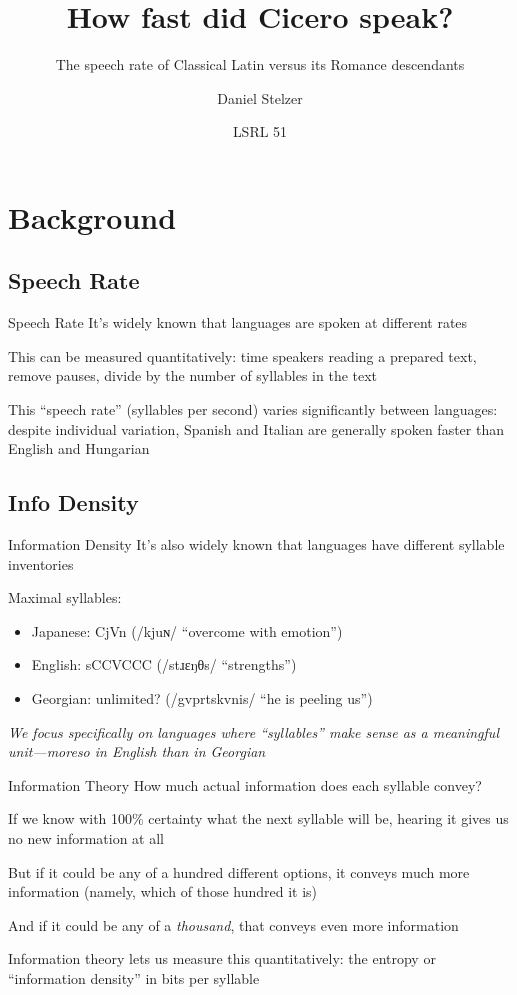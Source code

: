 \documentclass{beamer}
\title{How fast did Cicero speak?} \subtitle{The speech rate of Classical Latin versus its Romance descendants}
\author{Daniel Stelzer}
\institute{University of Illinois at Urbana-Champaign}
\date{LSRL 51}
\DeclareRobustCommand\ipa[1]{{\ipafamily/#1/}}
\begin{document}
\frame{\titlepage}

\section{Background}

\subsection{Speech Rate}

\begin{frame}{Speech Rate}
It's widely known that languages are spoken at different rates

This can be measured quantitatively: time speakers reading a prepared text, remove pauses, divide by the number of syllables in the text

This ``speech rate'' (syllables per second) varies significantly between languages: despite individual variation, Spanish and Italian are generally spoken faster than English and Hungarian
\end{frame}

\subsection{Info Density}

\begin{frame}{Information Density}
It's also widely known that languages have different syllable inventories

Maximal syllables:
\vspace{-1em}
\begin{itemize}
    \item Japanese: CjVn (\ipa{kjuɴ} ``overcome with emotion'')
    \item English: sCCVCCC (\ipa{stɹɛŋθs} ``strengths'')
    \item Georgian: unlimited? (\ipa{gvprtskvnis} ``he is peeling us'')
\end{itemize}

\emph{We focus specifically on languages where ``syllables'' make sense as a meaningful unit---moreso in English than in Georgian}
\end{frame}

\begin{frame}{Information Theory}
How much actual information does each syllable convey?

If we know with 100\% certainty what the next syllable will be, hearing it gives us no new information at all

But if it could be any of a hundred different options, it conveys much more information (namely, which of those hundred it is)

And if it could be any of a \emph{thousand}, that conveys even more information

Information theory lets us measure this quantitatively: the entropy or ``information density'' in bits per syllable
\end{frame}
\end{document}
